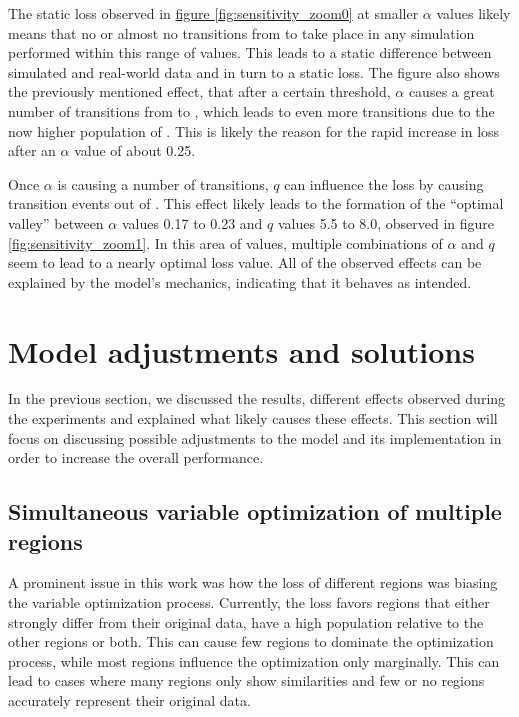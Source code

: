 The static loss observed in \hyperref[fig:sensitivity_zoom0]{figure \ref*{fig:sensitivity_zoom0}} at smaller $\alpha$ values likely means
that no or almost no transitions from  to  take place in any simulation performed within this range of values. This
leads to a static difference between simulated and real-world data and in turn to a static loss. The figure also shows the
previously mentioned effect, that after a certain threshold, $\alpha$ causes a great number of transitions from  to , which
leads to even more transitions due to the now higher population of . This is likely the reason for the rapid increase in loss
after an $\alpha$ value of about 0.25. \newline 

Once $\alpha$ is causing a number of transitions, $q$ can influence the loss by causing transition events out of .
This effect likely leads to the formation of the ``optimal valley'' between $\alpha$ values 0.17 to 0.23 and $q$ values
5.5 to 8.0, observed in figure \ref*{fig:sensitivity_zoom1}. In this area of values, multiple combinations of $\alpha$ and
$q$ seem to lead to a nearly optimal loss value. All of the observed effects can be explained by the model's mechanics, indicating that
it behaves as intended.


\section{Model adjustments and solutions}
In the previous section, we discussed the results, different effects observed during the experiments and explained what
likely causes these effects. This section will focus on discussing possible adjustments to the model and its implementation
in order to increase the overall performance.


\subsection{Simultaneous variable optimization of multiple regions}
A prominent issue in this work was how the loss of different regions was biasing the variable optimization process. Currently, the loss
favors regions that either strongly differ from their original data, have a high population relative to the other regions or
both. This can cause few regions to dominate the optimization process, while most regions influence the optimization only marginally.
This can lead to cases where many regions only show similarities and few or no regions accurately represent their original data. \newline

